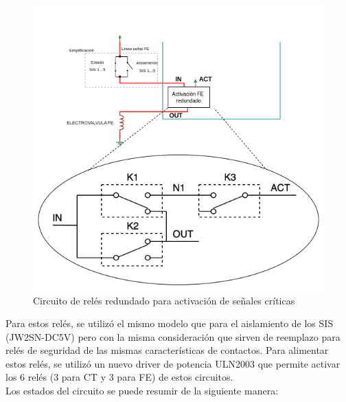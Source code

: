 \begin{figure}[H]
    \centering
    \includegraphics[width = \linewidth]{img/reles_critico.png}
    \caption{Circuito de relés redundado para activación de señales críticas}
    \label{fig:reles_critico}
\end{figure}

Para estos relés, se utilizó el mismo modelo que para el aislamiento de los SIS (JW2SN-DC5V) pero con la misma consideración que sirven de reemplazo para relés de seguridad de las mismas características de contactos. Para alimentar estos relés, se utilizó un nuevo driver de potencia ULN2003 que permite activar los 6 relés (3 para CT y 3 para FE) de estos circuitos. \\ 

Los estados del circuito se puede resumir de la siguiente manera:

